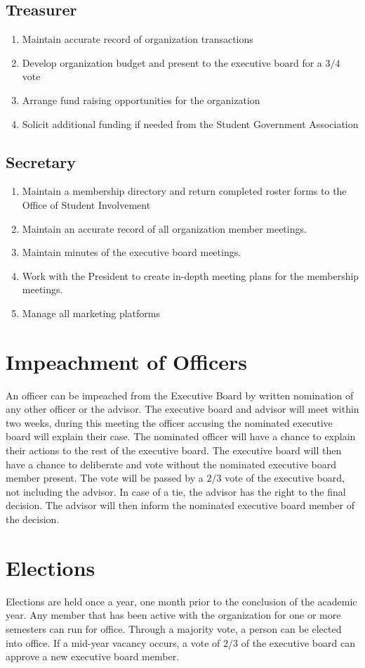 \documentclass{article}
\newcommand{\article}[1]{\section{#1} \label{#1}}
\newcommand{\asection}[1]{\subsection{#1} \label{#1}}
\begin{document}
\asection{Treasurer}
\begin{enumerate}
\item Maintain accurate record of organization transactions
\item Develop organization budget and present to the executive board for a $3/4$ vote
\item Arrange fund raising opportunities for the organization
\item Solicit additional funding if needed from the Student Government Association
\end{enumerate}

\asection {Secretary}
\begin{enumerate}
\item Maintain a membership directory and return completed roster forms to the Office of Student Involvement
\item Maintain an accurate record of all organization member meetings.
\item Maintain minutes of the executive board meetings.
\item Work with the President to create in-depth meeting plans for the membership meetings.
\item Manage all marketing platforms
\end{enumerate}

\article{Impeachment of Officers}
An officer can be impeached from the Executive Board by written nomination of any other officer or the advisor. 
The executive board and advisor will meet within two weeks, during this meeting the officer accusing the nominated executive board will explain their case. 
The nominated officer will have a chance to explain their actions to the rest of the executive board. 
The executive board will then have a chance to deliberate and vote without the nominated executive board member present. 
The vote will be passed by a $2/3$ vote of the executive board, not including the advisor. 
In case of a tie, the advisor has the right to the final decision. 
The advisor will then inform the nominated executive board member of the decision.

\article{Elections}
Elections are held once a year, one month prior to the conclusion of the academic year. 
Any member that has been active with the organization for one or more semesters can run for office. 
Through a majority vote, a person can be elected into office. 
If a mid-year vacancy occurs, a vote of $2/3$ of the executive board can approve a new executive board member.
\end{document}
